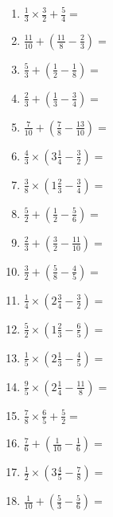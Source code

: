 \documentclass[12pt]{article}
\begin{document}
\begin{enumerate}[ itemsep=1.5cm]
	\item $\displaystyle \frac{1}{3} \times \frac{3}{2} + \frac{5}{4} =$
	\item $\displaystyle \frac{11}{10} + \left( \frac{11}{8} - \frac{2}{3} \right) =$
	\item $\displaystyle \frac{5}{3} + \left( \frac{1}{2} - \frac{1}{8} \right) =$
	\item $\displaystyle \frac{2}{3} + \left( \frac{1}{3} - \frac{3}{4} \right) =$
	\item $\displaystyle \frac{7}{10} + \left( \frac{7}{8} - \frac{13}{10} \right) =$
	\item $\displaystyle \frac{4}{3} \times \left( 3 \frac{1}{4} - \frac{3}{2} \right) =$
	\item $\displaystyle \frac{3}{8} \times \left( 1 \frac{2}{3} - \frac{3}{4} \right) =$
	\item $\displaystyle \frac{5}{2} + \left( \frac{1}{2} - \frac{5}{6} \right) =$
	\item $\displaystyle \frac{2}{3} + \left( \frac{3}{2} - \frac{11}{10} \right) =$

	\item $\displaystyle \frac{3}{2} + \left( \frac{5}{8} - \frac{4}{5} \right) =$
	\item $\displaystyle \frac{1}{4} \times \left( 2 \frac{3}{4} - \frac{3}{2} \right) =$
	\item $\displaystyle \frac{5}{2} \times \left( 1 \frac{2}{3} - \frac{6}{5} \right) =$
	\item $\displaystyle \frac{1}{5} \times \left( 2 \frac{1}{3} - \frac{4}{5} \right) =$
	\item $\displaystyle \frac{9}{5} \times \left( 2 \frac{1}{4} - \frac{11}{8} \right) =$
	\item $\displaystyle \frac{7}{8} \times \frac{6}{5} + \frac{5}{2} =$
	\item $\displaystyle \frac{7}{6} + \left( \frac{1}{10} - \frac{1}{6} \right) =$
	\item $\displaystyle \frac{1}{2} \times \left( 3 \frac{4}{5} - \frac{7}{8} \right) =$
	\item $\displaystyle \frac{1}{10} + \left( \frac{5}{3} - \frac{5}{6} \right) =$


\end{enumerate}
\end{document}
